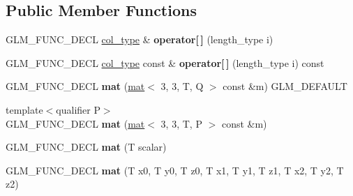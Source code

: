 \subsection*{Public Member Functions}
\begin{DoxyCompactItemize}
\item 
\mbox{\label{structglm_1_1mat_3_013_00_013_00_01T_00_01Q_01_4_a2507891a0a3b6c233c4f8a58071a7d9e}} 
G\+L\+M\+\_\+\+F\+U\+N\+C\+\_\+\+D\+E\+CL \hyperlink{structglm_1_1vec_3_013_00_01T_00_01Q_01_4}{col\+\_\+type} \& {\bfseries operator\mbox{[}$\,$\mbox{]}} (length\+\_\+type i)
\item 
\mbox{\label{structglm_1_1mat_3_013_00_013_00_01T_00_01Q_01_4_abce9d671a13bf9f9a315b7f8b5042617}} 
G\+L\+M\+\_\+\+F\+U\+N\+C\+\_\+\+D\+E\+CL \hyperlink{structglm_1_1vec_3_013_00_01T_00_01Q_01_4}{col\+\_\+type} const  \& {\bfseries operator\mbox{[}$\,$\mbox{]}} (length\+\_\+type i) const
\item 
\mbox{\label{structglm_1_1mat_3_013_00_013_00_01T_00_01Q_01_4_a50b0a78375a61cc17c0130b68c9b65f9}} 
G\+L\+M\+\_\+\+F\+U\+N\+C\+\_\+\+D\+E\+CL {\bfseries mat} (\hyperlink{structglm_1_1mat}{mat}$<$ 3, 3, T, Q $>$ const \&m) G\+L\+M\+\_\+\+D\+E\+F\+A\+U\+LT
\item 
\mbox{\label{structglm_1_1mat_3_013_00_013_00_01T_00_01Q_01_4_aae28d933e5da966c65e9d7bda94d260c}} 
{\footnotesize template$<$qualifier P$>$ }\\G\+L\+M\+\_\+\+F\+U\+N\+C\+\_\+\+D\+E\+CL {\bfseries mat} (\hyperlink{structglm_1_1mat}{mat}$<$ 3, 3, T, P $>$ const \&m)
\item 
\mbox{\label{structglm_1_1mat_3_013_00_013_00_01T_00_01Q_01_4_a160e453409d1d5117cf67d5c5ae2285e}} 
G\+L\+M\+\_\+\+F\+U\+N\+C\+\_\+\+D\+E\+CL {\bfseries mat} (T scalar)
\item 
\mbox{\label{structglm_1_1mat_3_013_00_013_00_01T_00_01Q_01_4_ad7c3c96a7df01d25b0993114233ad019}} 
G\+L\+M\+\_\+\+F\+U\+N\+C\+\_\+\+D\+E\+CL {\bfseries mat} (T x0, T y0, T z0, T x1, T y1, T z1, T x2, T y2, T z2)

\end{DoxyCompactItemize}
